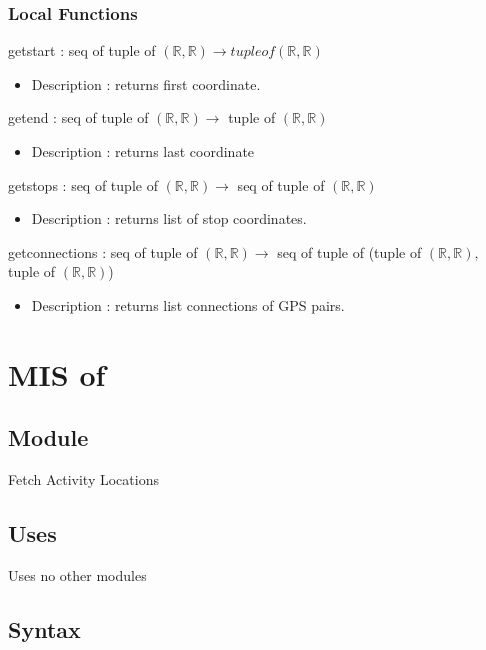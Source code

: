 \documentclass[12pt, titlepage]{article}
\begin{document}
\subsubsection{Local Functions}

getstart : seq of tuple of $(\mathbb{R}, \mathbb{R})  \rightarrow tuple of (\mathbb{R}, \mathbb{R})$
\begin{itemize}
    \item Description : returns first coordinate.
\end{itemize}
getend : seq of tuple of $(\mathbb{R}, \mathbb{R})  \rightarrow$ tuple of $(\mathbb{R}, \mathbb{R})$
\begin{itemize}
    \item Description : returns last coordinate
\end{itemize}
getstops : seq of tuple of $(\mathbb{R}, \mathbb{R})  \rightarrow$ seq of tuple of $(\mathbb{R}, \mathbb{R})$
\begin{itemize}
    \item Description : returns list of stop coordinates.
\end{itemize}
getconnections : seq of tuple of $(\mathbb{R}, \mathbb{R})  \rightarrow$ seq of tuple of (tuple of $(\mathbb{R}, \mathbb{R}),$ tuple of $(\mathbb{R}, \mathbb{R})$)
\begin{itemize}
    \item Description : returns list connections of GPS pairs.
\end{itemize}
\newpage


\section{MIS of } \label{ModuleSPath} 

\subsection{Module}
Fetch Activity Locations

\subsection{Uses}%
Uses no other modules

\subsection{Syntax}
\end{document}
